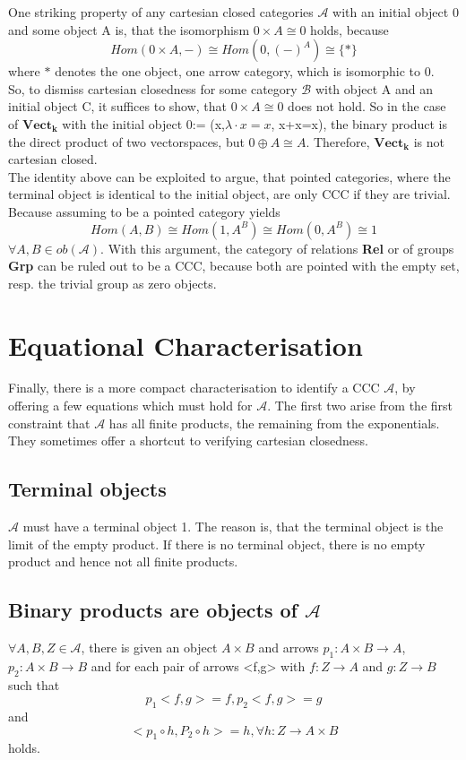One striking property of any cartesian closed categories $\mathcal{A}$ with an initial object 0 and some object A is, that the isomorphism $0 \times A \cong 0$ holds,
because $$Hom(0 \times A, -) \cong Hom(0, (-)^A) \cong \{ \ast \}$$
where {$\ast$} denotes the one object, one arrow category, which is isomorphic to 0.
 \\
 So, to dismiss cartesian closedness for some category $\mathcal{B}$ with object A and an initial object C, it suffices to show, that $0 \times A \cong 0$ does not hold.
So in the case of $\boldsymbol{Vect_k}$ with the initial object 0:= ({x},$\lambda \cdot x=x$, x+x=x), the binary product is the direct product of two vectorspaces, but $0 \oplus A \cong A$. Therefore, $\boldsymbol{Vect_k}$ is not cartesian closed.
 \\
The identity above can be exploited to argue, that pointed categories, where the terminal object is identical to the initial object, are only CCC if they are trivial.
Because assuming  to be a pointed category yields $$Hom(A,B) \cong Hom(1,A^B) \cong Hom(0,A^B) \cong 1$$  $\forall A,B \in ob(\mathcal{A})$.
With this argument, the category of relations \textbf{Rel} or of groups \textbf{Grp} can be ruled out to be a CCC, because both are pointed with the empty set, resp. the trivial group as zero objects. 
 


\section{Equational Characterisation}
Finally, there is a more compact characterisation to identify a CCC $\mathcal{A}$, by offering a few equations which must hold for $\mathcal{A}$.
The first two arise from the first constraint that $\mathcal{A}$ has all finite products, the remaining from the exponentials.
They sometimes offer a shortcut to verifying cartesian closedness.
\subsection{Terminal objects}
$\mathcal{A}$ must have a terminal object 1. The reason is, that the terminal object is the limit of the empty product.
If there is no terminal object, there is no empty product and hence not all finite products.
\subsection{Binary products are objects of $\mathcal{A}$}
$\forall A,B,Z\in \mathcal{A}$, there is given an object $A \times B$ and arrows $p_1:A \times B \to A$, $p_2:A \times B \to B$ and for each pair of arrows <f,g> with $f:Z \to A$ and $g:Z \to B$ such that
$$ p_1<f,g> = f, p_2<f,g>=g$$ and $$<p_1 \circ  h,P_2 \circ h> = h, \forall h : Z \to A \times B $$ holds.
